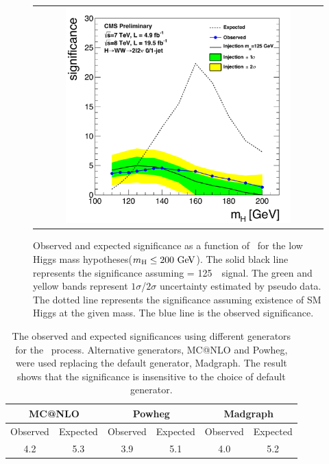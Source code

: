%
\begin{figure}[htp] 
\centering 
\begin{tabular}{c} 
\includegraphics[width=0.8\textwidth]{figures/signif_allcomb_inj125_data_zoom.pdf} 
\end{tabular} 
\caption{Observed and expected significance as a function of \mHi\ for 
the low Higgs mass hypotheses($m_{\mathrm{H}}\le200~\mathrm{Ge\kern -0.1em V}$). 
The solid black line represents the significance assuming \mHi = 125~\GeV\ signal. 
The green and yellow bands represent $1\sigma$/$2\sigma$ uncertainty 
estimated by pseudo data. The dotted line represents the significance 
assuming existence of SM Higgs at the given mass. 
The blue line is the observed significance. 
} 
\label{fig:significane_mH} 
\end{figure} 

%
\begin{table}[htp] 
\begin{center} 
\begin{tabular}{cc|cc|cc} 
\hline 
\multicolumn{2}{c|}{MC@NLO}   &  \multicolumn{2}{c|}{Powheg} & \multicolumn{2}{c}{Madgraph} \\
\hline \hline 
Observed & Expected & Observed & Expected &  Observed & Expected \\ 
\hline 
4.2 & 5.3 & 3.9 & 5.1 & 4.0 & 5.2 \\
\hline 
\end{tabular} 
\caption{The observed and expected significances
using different generators for the \qqww\ process. Alternative generators,
MC@NLO and Powheg, were used replacing the default generator, Madgraph.
The result shows that the significance is insensitive to the choice
of default generator.} 
\label{tab:sig_diffgenerator} 
\end{center} 
\end{table} 


